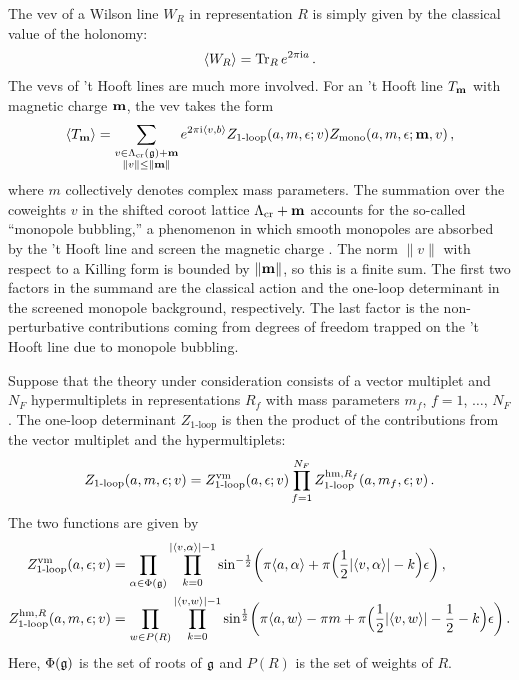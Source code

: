 The vev of a Wilson line $W_R$ in representation $R$ is simply given
by the classical value of the holonomy:
\begin{equation}
  \label{eq:vev-W}
    \langle W_R \rangle = \mathop{\mathrm{Tr}}\nolimits_R e^{2\pi \mathrm{i} a} \,.
\end{equation}
The vevs of 't Hooft lines are much more involved.  For an 't Hooft
line $T_{\mathbf{m}}$ with magnetic charge $\mathbf{m}$, the vev takes the form
\begin{equation}
  \label{eq:vev-T}
  \langle T_{\mathbf{m}} \rangle
  =
  \sum_{\substack{v \in \Lambda_{\mathrm{cr}}(\mathfrak{g}) + \mathbf{m} \\ \|v\| \leq \|\mathbf{m}\|}}
  e^{2\pi \mathrm{i} \langle v, b\rangle}
  Z_{\text{1-loop}}(a,m,\epsilon; v) Z_{\text{mono}}(a,m,\epsilon; \mathbf{m},v) \,,
\end{equation}
where $m$ collectively denotes complex mass parameters.  The summation
over the coweights $v$ in the shifted coroot lattice
$\Lambda_{\mathrm{cr}} + \mathbf{m}$ accounts for the so-called ``monopole
bubbling,'' a phenomenon in which smooth monopoles are absorbed by the
't Hooft line and screen the magnetic charge \cite{Kapustin:2006pk}.  The norm $\|v\|$ with
respect to a Killing form is bounded by $\|\mathbf{m}\|$, so this is a
finite sum.  The first two factors in the summand are the classical
action and the one-loop determinant in the screened monopole
background, respectively.  The last factor is the non-perturbative
contributions coming from degrees of freedom trapped on the 't Hooft
line due to monopole bubbling.

Suppose that the theory under consideration consists of a vector
multiplet and $N_F$ hypermultiplets in representations $R_f$ with mass
parameters $m_f$, $f = 1$, $\dotsc$, $N_F$.  The one-loop determinant
$Z_{\text{1-loop}}$ is then the product of the contributions from the
vector multiplet and the hypermultiplets:
\begin{equation}
  Z_{\text{1-loop}}(a,m,\epsilon; v)
  =
  Z_{\text{1-loop}}^{\mathrm{vm}}(a,\epsilon; v)
  \prod_{f=1}^{N_F} Z_{\text{1-loop}}^{\mathrm{hm}, R_f}(a,m_f,\epsilon; v) \,.
\end{equation}
The two functions are given by
\begin{align}
  Z_{\text{1-loop}}^{\mathrm{vm}}(a,\epsilon; v)
  &=\prod_{\alpha \in \Phi(\mathfrak{g})} \prod_{k=0}^{|\langle v, \alpha\rangle| - 1}
    \sin^{-\frac12}
    \biggl(\pi\langle a, \alpha\rangle + \pi\Big(\frac12 |\langle v, \alpha\rangle| - k\Bigr)\epsilon\biggr) \,,
  \\
  Z_{\text{1-loop}}^{\mathrm{hm}, R}(a,m,\epsilon; v)
  &=\prod_{w \in P(R)}\prod_{k=0}^{|\langle v, w\rangle| - 1}
    \sin^{\frac12}\biggl(\pi \langle a, w\rangle - \pi m
    + \pi\Bigl(\frac12|\langle v, w\rangle| - \frac12 - k\Bigr)\epsilon\biggr) \,.
\end{align}
Here, $\Phi(\mathfrak{g})$ is the set of roots of $\mathfrak{g}$ and $P(R)$ is the set
of weights of $R$.

